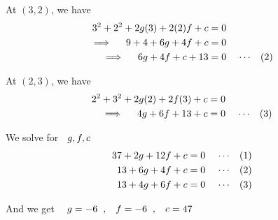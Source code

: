 \documentclass[11pt,a4paper]{article}
\begin{document}
\begin{enumerate}
At $(3,2)$, we have 
\begin{align*}
3^2 +2^2 + 2g(3) + 2(2)f + c & = 0\\
\implies\hspace{0.4cm} 9 + 4 + 6g + 4f + c & = 0\\
\implies \hspace{0.4cm} 6g + 4f + c + 13 & = 0\hspace{0.4cm} \cdots\hspace{0.3cm} (2)\\
\end{align*}



At $(2,3)$, we have
\begin{align*}
2^2 + 3^2 + 2g(2) + 2f(3) + c & = 0\\
\implies \hspace{0.4cm} 4g + 6f + 13 + c & = 0\hspace{0.4cm} \cdots\hspace{0.3cm} (3)\\
\end{align*}


We solve for $\hspace{0.2cm} g, f, c$
\begin{align*}
37 + 2g + 12f + c & =  0\hspace{0.4cm} \cdots\hspace{0.3cm} (1)\\
13 + 6g + 4f  + c & =  0\hspace{0.4cm} \cdots\hspace{0.3cm} (2)\\
13 + 4g + 6f +  c & =  0\hspace{0.4cm} \cdots\hspace{0.3cm} (3)
\end{align*}

And we get $\hspace{0.3cm} g = -6\hspace{0.2cm}, \hspace{0.3cm} f = -6\hspace{0.2cm} , \hspace{0.3cm} c = 47$\\\\
\end{enumerate}
\end{document}
